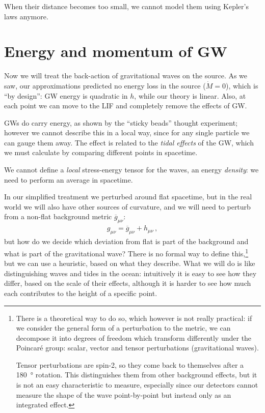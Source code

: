 \documentclass[main.tex]{subfiles}
\begin{document}


When their distance becomes too small, we cannot model them using Kepler's laws anymore. 

\section{Energy and momentum of GW}

Now we will treat the back-action of gravitational waves on the source.
As we saw, our approximations predicted no energy loss in the source (\(\dot{M} = 0\)), which is ``by design'': GW energy is quadratic in \(h\), while our theory is linear. 
Also, at each point we can move to the LIF and completely remove the effects of GW. 
 
GWs do carry energy, as shown by the ``sticky beads'' thought experiment; however we cannot describe this in a local way, since for any single particle we can gauge them away.
The effect is related to the \emph{tidal effects} of the GW, which we must calculate by comparing different points in spacetime. 

We cannot define a \emph{local} stress-energy tensor for the waves, an energy \emph{density}: we need to perform an average in spacetime. 

In our simplified treatment we perturbed around flat spacetime, but in the real world we will also have other sources of curvature, and we will need to perturb from a non-flat background metric \(\overline{g}_{\mu \nu }\): 
%
\begin{align}
g_{\mu \nu } = \overline{g}_{\mu \nu } + h_{\mu \nu }
\,,
\end{align}
%
but how do we decide which deviation from flat is part of the background and what is part of the gravitational wave?
There is no formal way to define this,\footnote{There is a theoretical way to do so, which however is not really practical: if we consider the general form of a perturbation to the metric, we can decompose it into degrees of freedom which transform differently under the Poincaré group: scalar, vector and tensor perturbations (gravitational waves). 

Tensor perturbations are spin-2, so they come back to themselves after a \SI{180}{\degree} rotation. This distinguishes them from other background effects, but it is not an easy characteristic to measure, especially since our detectors cannot measure the shape of the wave point-by-point but instead only as an integrated effect.
}
but we can use a heuristic, based on what they describe. 
What we will do is like distinguishing waves and tides in the ocean: intuitively it is easy to see how they differ, based on the scale of their effects, although it is harder to see how much each contributes to the height of a specific point.
\end{document}
